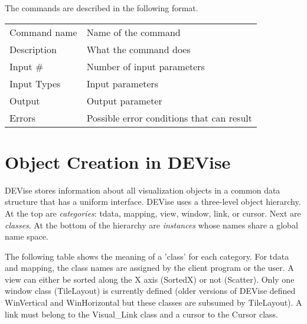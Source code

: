 The commands are described in the following format.

\bigskip

\noindent
\begin{tabular}{l|p{5in}}
\hline
Command name & Name of the command \\
Description  & What the command does \\
Input \#     & Number of input parameters \\
Input Types  & Input parameters \\
Output       & Output parameter \\
Errors       & Possible error conditions that can result \\
\hline
\end{tabular}

\section{Object Creation in DEVise\protect\label{objcreate}}

DEVise stores information about all visualization objects in a common
data structure that has a uniform interface. DEVise uses a three-level
object hierarchy. At the top are {\em categories}: tdata, mapping,
view, window, link, or cursor. Next are {\em classes}. At the bottom
of the hierarchy are {\em instances} whose names share a global name
space.

The following table shows the meaning of a 'class' for each category.
For tdata and mapping, the class names are assigned by the client
program or the user. A view can either be sorted along the X axis
(SortedX) or not (Scatter). Only one window class (TileLayout) is
currently defined (older versions of DEVise defined WinVertical and
WinHorizontal but these classes are subsumed by TileLayout). A link
must belong to the Visual\_Link class and a cursor to the Cursor
class.

\bigskip

